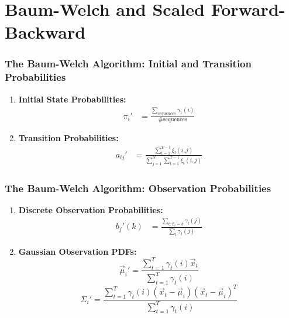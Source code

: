 \documentclass{beamer}
\begin{document}
\section[Baum-Welch]{Baum-Welch and Scaled Forward-Backward}
\setcounter{subsection}{1}

\begin{frame}
  \frametitle{The Baum-Welch Algorithm: Initial and Transition Probabilities}

  \begin{enumerate}
  \item {\bf Initial State Probabilities:}
    \begin{align*}
      \pi_i' &=\frac{\sum_{sequences} \gamma_1(i)}{\mbox{\# sequences}}
    \end{align*}
  \item {\bf Transition Probabilities:}
    \begin{align*}
      a_{ij}' &=\frac{\sum_{t=1}^{T-1} \xi_t(i,j)}{\sum_{j=1}^N\sum_{t=1}^{T-1}\xi_t(i,j)}
    \end{align*}
  \end{enumerate}
\end{frame}

\begin{frame}
  \frametitle{The Baum-Welch Algorithm: Observation Probabilities}
  \begin{enumerate}
  \item {\bf Discrete Observation Probabilities:}
    \begin{align*}
      b_{j}'(k) &=\frac{\sum_{t:\vec{x}_t=k} \gamma_t(j)}{\sum_{t}\gamma_t(j)}
    \end{align*}
  \item {\bf Gaussian Observation PDFs:}
    \begin{displaymath}
      \vec\mu_{i}' = \frac{\sum_{t=1}^T\gamma_t(i)\vec{x}_{t}}{\sum_{t=1}^T\gamma_t(i)}
    \end{displaymath}
    \begin{displaymath}
      \Sigma_{i}' = \frac{\sum_{t=1}^T\gamma_t(i)(\vec{x}_{t}-\vec\mu_{i})(\vec{x}_t-\vec\mu_i)^T}{\sum_{t=1}^T\gamma_t(i)}
    \end{displaymath}
  \end{enumerate}
\end{frame}
\end{document}
